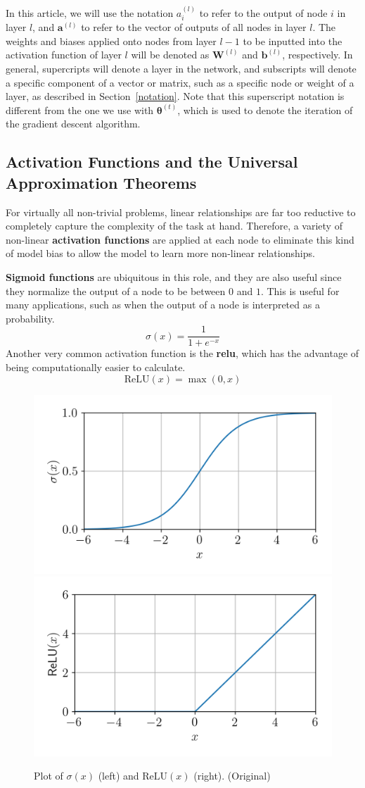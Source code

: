 \documentclass[12pt]{report}
\theoremstyle{definition}
\theoremstyle{remark}
\begin{document}
In this article, we will use the notation $a^{(l)}_i$ to refer to the output of node $i$ in layer $l$, and $\mathbf{a}^{(l)}$ to refer to the vector of outputs of all nodes in layer $l$. The weights and biases applied onto nodes from layer $l-1$ to be inputted into the activation function of layer $l$ will be denoted as $\mathbf{W}^{(l)}$ and $\mathbf{b}^{(l)}$, respectively. In general, supercripts will denote a layer in the network, and subscripts will denote a specific component of a vector or matrix, such as a specific node or weight of a layer, as described in Section~\ref{notation}. Note that this superscript notation is different from the one we use with $\boldsymbol{\theta}^{(t)}$, which is used to denote the iteration of the gradient descent algorithm.

\subsection{Activation Functions and the Universal Approximation Theorems}

For virtually all non-trivial problems, linear relationships are far too reductive to completely capture the complexity of the task at hand. Therefore, a variety of non-linear \textbf{activation functions} are applied at each node to eliminate this kind of model bias to allow the model to learn more non-linear relationships.

\textbf{Sigmoid functions} are ubiquitous in this role, and they are also useful since they normalize the output of a node to be between $0$ and $1$. This is useful for many applications, such as when the output of a node is interpreted as a probability.
\begin{equation}
    \sigma(x) = \frac{1}{1+e^{-x}}
\end{equation}
Another very common activation function is the \textbf{\gls{relu}}, which has the advantage of being computationally easier to calculate.
\begin{equation}
    \text{ReLU}(x) = \max(0,x)
\end{equation}
\begin{figure}[h]
    \centering
    \includegraphics[width=0.45\linewidth]{figs/sigmoid.png}
    \includegraphics[width=0.45\linewidth]{figs/relu.png}
    \caption{Plot of $\sigma(x)$ (left) and $\text{ReLU}(x)$ (right). (Original)}
    \label{fig:enter-label}
\end{figure}
\end{document}
